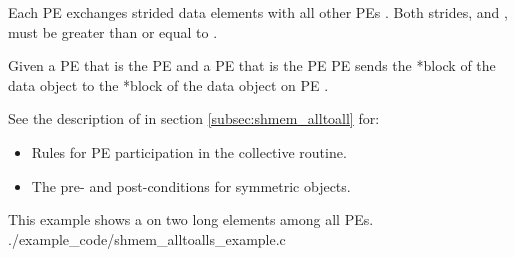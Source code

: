 \begin{apidefinition}
{    Each \ac{PE}  
    exchanges  strided data elements 
    with all other \acp{PE}  .
    Both strides,  and , must be greater
    than or equal to .

    
    Given a \ac{PE}  that is the \kth \ac{PE} 
     and a \ac{PE}
     that is the \lth \ac{PE} 
    \ac{PE}  sends the *\lth block of the  data object to
    the *\kth block of the  data object on
    \ac{PE} .

{\color{Green}
    See the description of  in section
    \ref{subsec:shmem_alltoall} for:
    \begin{itemize}
    \item Rules for \ac{PE} participation in the collective routine.
    \item The pre- and post-conditions for symmetric objects.
    \end{itemize}
}
    
} 




\begin{apiexamples}

\apicexample
    {This example shows a  on two long elements among
    all \acp{PE}.}
    {./example_code/shmem_alltoalls_example.c}
    {}

\end{apiexamples}

\end{apidefinition}
